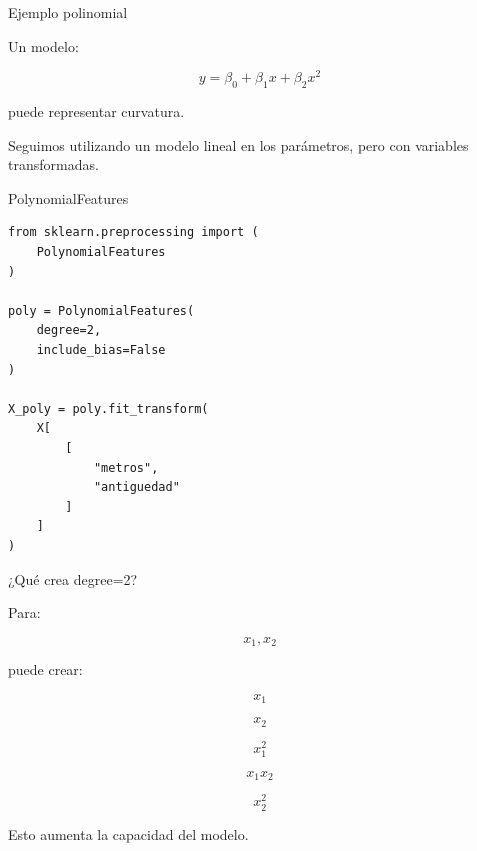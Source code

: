 \documentclass[aspectratio=169,11pt]{beamer}
\begin{document}
\begin{frame}{Ejemplo polinomial}

Un modelo:

\[
y
=
\beta_0
+
\beta_1x
+
\beta_2x^2
\]

puede representar curvatura.

\vspace{0.5cm}

Seguimos utilizando un modelo lineal en los parámetros,
pero con variables transformadas.

\end{frame}


\begin{frame}[fragile]{PolynomialFeatures}

\begin{lstlisting}
from sklearn.preprocessing import (
    PolynomialFeatures
)

poly = PolynomialFeatures(
    degree=2,
    include_bias=False
)

X_poly = poly.fit_transform(
    X[
        [
            "metros",
            "antiguedad"
        ]
    ]
)
\end{lstlisting}

\end{frame}


\begin{frame}{¿Qué crea degree=2?}

Para:

\[
x_1,x_2
\]

puede crear:

\[
x_1
\]

\[
x_2
\]

\[
x_1^2
\]

\[
x_1x_2
\]

\[
x_2^2
\]

\vspace{0.4cm}

Esto aumenta la capacidad del modelo.

\end{frame}

\end{document}
